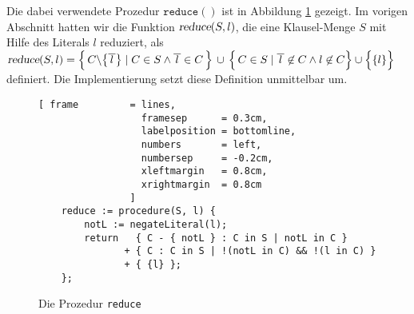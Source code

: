 Die dabei verwendete Prozedur $\texttt{reduce}()$ ist in Abbildung \ref{fig:reduce} gezeigt.
Im vorigen Abschnitt hatten wir die Funktion $\textsl{reduce}(S, l)$, die eine
Klausel-Menge $S$ mit Hilfe des Literals $l$ reduziert, als
\\[0.2cm]
\hspace*{1.3cm}
$\textsl{reduce}(S,l)  = 
 \Bigl\{\, C \backslash \bigl\{\overline{\,l\,}\bigr\} \;|\; C \in S \wedge \overline{\,l\,} \in C \,\Bigr\} 
       \,\cup\, \Bigl\{\, C \in S \mid \overline{\,l\,} \not\in C \wedge l \not\in C \Bigr\} \cup \Bigl\{\{l\}\Bigr\}
$
\\[0.2cm]
definiert.
Die Implementierung setzt diese Definition unmittelbar um.  


\begin{figure}[!ht]
  \centering
\begin{Verbatim}[ frame         = lines, 
                  framesep      = 0.3cm, 
                  labelposition = bottomline,
                  numbers       = left,
                  numbersep     = -0.2cm,
                  xleftmargin   = 0.8cm,
                  xrightmargin  = 0.8cm
                ]
    reduce := procedure(S, l) {
        notL := negateLiteral(l);
        return   { C - { notL } : C in S | notL in C } 
               + { C : C in S | !(notL in C) && !(l in C) } 
               + { {l} };
    };
\end{Verbatim}
\vspace*{-0.3cm}
  \caption{Die Prozedur \texttt{reduce}}
  \label{fig:reduce}
\end{figure} 

